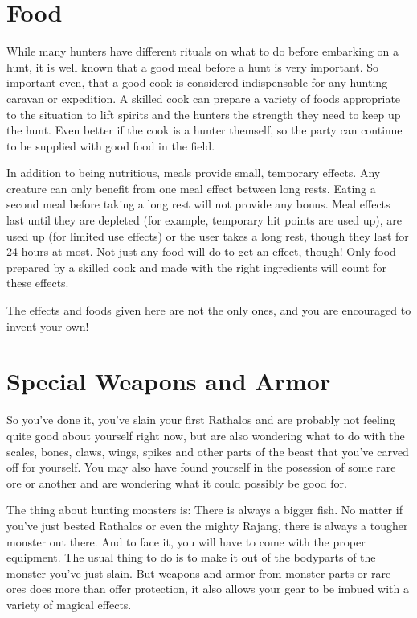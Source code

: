 \newpage
\section{Food}

While many hunters have different rituals on what to do before embarking on a hunt, it is well known that a good meal before a hunt is very important. So important even, that a good cook is considered indispensable for any hunting caravan or expedition. A skilled cook can prepare a variety of foods appropriate to the situation to lift spirits and the hunters the strength they need to keep up the hunt. Even better if the cook is a hunter themself, so the party can continue to be supplied with good food in the field.

In addition to being nutritious, meals provide small, temporary effects. Any creature can only benefit from one meal effect between long rests. Eating a second meal before taking a long rest will not provide any bonus. Meal effects last until they are depleted (for example, temporary hit points are used up), are used up (for limited use effects) or the user takes a long rest, though they last for 24 hours at most. Not just any food will do to get an effect, though! Only food prepared by a skilled cook and made with the right ingredients will count for these effects.

The effects and foods given here are not the only ones, and you are encouraged to invent your own!

\newpage
{}
\null

\clearpage
\section{Special Weapons and Armor}
So you've done it, you've slain your first Rathalos and are probably not feeling quite good about yourself right now, but are also wondering what to do with the scales, bones, claws, wings, spikes and other parts of the beast that you've carved off for yourself. You may also have found yourself in the posession of some rare ore or another and are wondering what it could possibly be good for.

The thing about hunting monsters is: There is always a bigger fish. No matter if you've just bested Rathalos or even the mighty Rajang, there is always a tougher monster out there. And to face it, you will have to come with the proper equipment. The usual thing to do is to make it out of the bodyparts of the monster you've just slain. But weapons and armor from monster parts or rare ores does more than offer protection, it also allows your gear to be imbued with a variety of magical effects.

